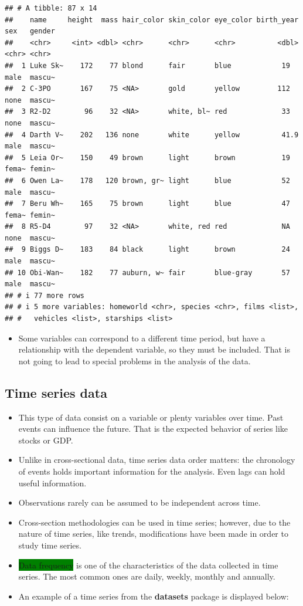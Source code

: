 \documentclass[
]{book}
\providecommand{\tightlist}{%
  \setlength{\itemsep}{0pt}\setlength{\parskip}{0pt}}
\newcommand{\key}[1]{\colorbox{green}{#1}}
\theoremstyle{definition}
\theoremstyle{definition}
\theoremstyle{definition}
\theoremstyle{definition}
\theoremstyle{remark}
\begin{document}
\begin{verbatim}
## # A tibble: 87 x 14
##    name     height  mass hair_color skin_color eye_color birth_year sex   gender
##    <chr>     <int> <dbl> <chr>      <chr>      <chr>          <dbl> <chr> <chr> 
##  1 Luke Sk~    172    77 blond      fair       blue            19   male  mascu~
##  2 C-3PO       167    75 <NA>       gold       yellow         112   none  mascu~
##  3 R2-D2        96    32 <NA>       white, bl~ red             33   none  mascu~
##  4 Darth V~    202   136 none       white      yellow          41.9 male  mascu~
##  5 Leia Or~    150    49 brown      light      brown           19   fema~ femin~
##  6 Owen La~    178   120 brown, gr~ light      blue            52   male  mascu~
##  7 Beru Wh~    165    75 brown      light      blue            47   fema~ femin~
##  8 R5-D4        97    32 <NA>       white, red red             NA   none  mascu~
##  9 Biggs D~    183    84 black      light      brown           24   male  mascu~
## 10 Obi-Wan~    182    77 auburn, w~ fair       blue-gray       57   male  mascu~
## # i 77 more rows
## # i 5 more variables: homeworld <chr>, species <chr>, films <list>,
## #   vehicles <list>, starships <list>
\end{verbatim}

\begin{itemize}
\tightlist
\item
  Some variables can correspond to a different time period, but have a relationship with the dependent variable, so they must be included. That is not going to lead to special problems in the analysis of the data.
\end{itemize}

\subsection*{Time series data}\label{time-series-data}

\begin{itemize}
\item
  This type of data consist on a variable or plenty variables over time. Past events can influence the future. That is the expected behavior of series like stocks or GDP.
\item
  Unlike in cross-sectional data, time series data order matters: the chronology of events holds important information for the analysis. Even lags can hold useful information.
\item
  Observations rarely can be assumed to be independent across time.
\item
  Cross-section methodologies can be used in time series; however, due to the nature of time series, like trends, modifications have been made in order to study time series.
\item
  \key{Data frequency} is one of the characteristics of the data collected in time series. The most common ones are daily, weekly, monthly and annually.
\item
  An example of a time series from the \textbf{datasets} package \citep{datasets} is displayed below:
\end{itemize}
\end{document}
